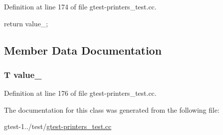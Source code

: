 \-Definition at line 174 of file gtest-\/printers\-\_\-test.\-cc.


\begin{DoxyCode}
{ return value_; }
\end{DoxyCode}


\subsection{\-Member \-Data \-Documentation}
\hypertarget{classfoo_1_1StreamableTemplateInFoo_ae496c0f6edafccdab7ef2e2b9d0c7e03}{
\subsubsection[{value\-\_\-}]{\setlength{\rightskip}{0pt plus 5cm}\-T {\bf value\-\_\-}}}\label{d8/dc1/classfoo_1_1StreamableTemplateInFoo_ae496c0f6edafccdab7ef2e2b9d0c7e03}


\-Definition at line 176 of file gtest-\/printers\-\_\-test.\-cc.



\-The documentation for this class was generated from the following file\-:\begin{DoxyCompactItemize}
\item 
gtest-\/1../test/\hyperlink{gtest-printers__test_8cc}{gtest-\/printers\-\_\-test.\-cc}\end{DoxyCompactItemize}
